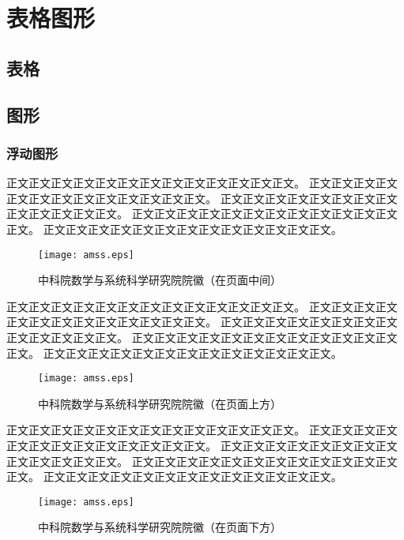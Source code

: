 ﻿
\chapter{表格图形}
\label{chap:tabfig}

\section{表格}


\section{图形}

\subsection{浮动图形}

正文正文正文正文正文正文正文正文正文正文正文正文正文。
正文正文正文正文正文正文正文正文正文正文正文正文正文。
正文正文正文正文正文正文正文正文正文正文正文正文正文。
正文正文正文正文正文正文正文正文正文正文正文正文正文。
正文正文正文正文正文正文正文正文正文正文正文正文正文。

\begin{figure}[h]
 \centering
 \texttt{[image: amss.eps]}
 \caption{中科院数学与系统科学研究院院徽（在页面中间）}
 \label{fig:amss1}
\end{figure}

正文正文正文正文正文正文正文正文正文正文正文正文正文。
正文正文正文正文正文正文正文正文正文正文正文正文正文。
正文正文正文正文正文正文正文正文正文正文正文正文正文。
正文正文正文正文正文正文正文正文正文正文正文正文正文。
正文正文正文正文正文正文正文正文正文正文正文正文正文。

\begin{figure}[t]
 \centering
 \texttt{[image: amss.eps]}
 \caption{中科院数学与系统科学研究院院徽（在页面上方）}
 \label{fig:amss1}
\end{figure}

正文正文正文正文正文正文正文正文正文正文正文正文正文。
正文正文正文正文正文正文正文正文正文正文正文正文正文。
正文正文正文正文正文正文正文正文正文正文正文正文正文。
正文正文正文正文正文正文正文正文正文正文正文正文正文。
正文正文正文正文正文正文正文正文正文正文正文正文正文。

\begin{figure}[b]
 \centering
 \texttt{[image: amss.eps]}
 \caption{中科院数学与系统科学研究院院徽（在页面下方）}
 \label{fig:amss1}
\end{figure}


